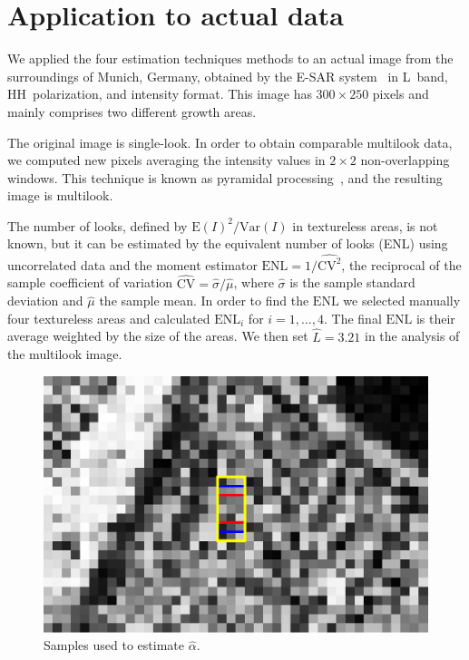 \documentclass[twocolumn]{svjour3}
\begin{document}

\section{Application to actual data}
\label{application}

We applied the four estimation techniques methods to an actual image from the surroundings of Munich, Germany, obtained by the E-SAR system~\cite{Horn1996} in L~band, HH~polarization, and intensity format. 
This image has $300\times250$ pixels and mainly comprises two different growth areas.

The original image is single-look.
In order to obtain comparable multilook data, we computed new pixels averaging the intensity values in $2\times2$ non-overlapping windows. This technique is known as pyramidal processing~\cite{Adelson1984}, and the resulting image is multilook.

The number of looks, defined by ${\text{E}(I)^2}/{\text{Var}(I)}$ in textureless areas, is not known, but it can be estimated by the equivalent number of looks (ENL) using uncorrelated data and the moment estimator
$\text{ENL}={1}/{\widehat{\text{CV}^2}}$, the reciprocal of the sample coefficient of variation $\widehat{\text{CV}}={\widehat{\sigma}}/{\widehat\mu}$, where $\widehat{\sigma}$ is the sample standard deviation and $\widehat\mu$ the sample mean.
In order to find the $\text{ENL}$ we selected manually four textureless areas and calculated $\text{ENL}_i$ for $i=1, \ldots, 4$. 
The final $\text{ENL}$ is their average weighted by the size of the areas. 
We then set $\widehat L=3.21$ in the analysis of the multilook image.

%	
\begin{figure}[htb]
	\centering
	\includegraphics[width=0.8\linewidth]{../../../Figures/PaperTesis/TresMuestrasAgrandada.eps}
	\caption{\label{TresMuestras}\small Samples used to estimate $\widehat{\alpha}$.}
\end{figure}
\end{document}

